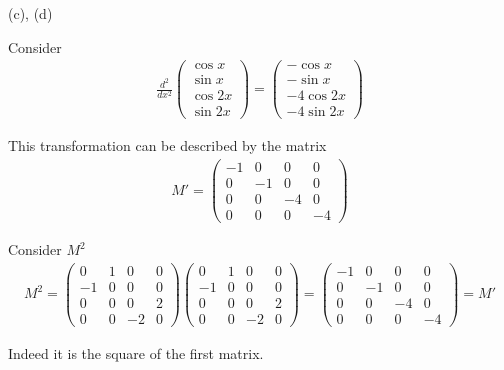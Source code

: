 \documentclass{article}
\begin{document}
(c), (d) 

Consider \begin{align*}
\frac{d^2}{dx^2}\begin{pmatrix}
\cos x \\ \sin x \\ \cos 2x \\ \sin 2x
\end{pmatrix} = \begin{pmatrix}
-\cos x \\ -\sin x \\ -4\cos 2x \\ -4\sin 2x
\end{pmatrix}
\end{align*}

This transformation can be described by the matrix 
\begin{align*}
M' = \begin{pmatrix}
-1 & 0 & 0 & 0 \\ 0 & -1 & 0 & 0 \\ 0 & 0 & -4 & 0 \\ 0 & 0 & 0 & -4 
\end{pmatrix}
\end{align*}

Consider $M^2$
\begin{align*}
M^2 = \begin{pmatrix}
0 & 1 & 0 & 0 \\ -1 & 0 & 0 & 0 \\ 0 & 0 & 0 & 2 \\ 0 & 0 & -2 & 0 
\end{pmatrix}\begin{pmatrix}
0 & 1 & 0 & 0 \\ -1 & 0 & 0 & 0 \\ 0 & 0 & 0 & 2 \\ 0 & 0 & -2 & 0 
\end{pmatrix} = \begin{pmatrix}
-1 & 0 & 0 & 0 \\ 0 & -1 & 0 & 0 \\ 0 & 0 & -4 & 0 \\ 0 & 0 & 0 & -4 
\end{pmatrix} = M'
\end{align*}

Indeed it is the square of the first matrix.
\end{document}
